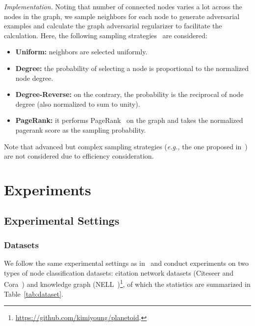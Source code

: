 \documentclass[10pt,journal,compsoc]{IEEEtran}
\newcommand{\eg}{\emph{e.g., }}
\begin{document}
\textit{Implementation.} Noting that number of connected nodes varies a lot across the nodes in the graph, we sample  neighbors for each node to generate adversarial examples and calculate the graph adversarial regularizer to facilitate the calculation.
Here, the following sampling strategies~\cite{ying2018graph} are considered:
\begin{itemize}[leftmargin=*]
	\item \textbf{Uniform:} neighbors are selected uniformly.
	\item \textbf{Degree:} the probability of selecting a node is proportional to the normalized node degree.
	\item \textbf{Degree-Reverse:} on the contrary, the probability is the reciprocal of node degree (also normalized to sum to unity).
	\item \textbf{PageRank:} it performs PageRank~\cite{page1999pagerank} on the graph and takes the normalized pagerank score as the sampling probability.
\end{itemize}
Note that advanced but complex sampling strategies (\eg the one proposed in~\cite{ying2018graph}) are not considered due to efficiency consideration.
 \section{Experiments}
\subsection{Experimental Settings}
\subsubsection{Datasets}
We follow the same experimental settings as in~\cite{kipf2017semi} and conduct experiments on two types of node classification datasets: citation network datasets (Citeseer and Cora~\cite{sen2008collective}) and knowledge graph (NELL~\cite{yang2016revisiting})\footnote{\url{https://github.com/kimiyoung/planetoid}.}, of which the statistics are summarized in Table~\ref{tab:dataset}.
\end{document}
